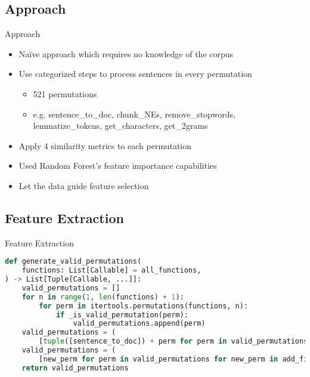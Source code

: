 \documentclass{beamer}
\begin{document}
\subsection{Approach}
\begin{frame}{Approach}
    \begin{itemize}
        \item Naïve approach which requires no knowledge of the corpus
        \item Use categorized steps to process sentences in every permutation
        \begin{itemize}
            \item 521 permutations
            \item e.g. sentence\_to\_doc, chunk\_NEs, remove\_stopwords, lemmatize\_tokens, get\_characters, get\_2grams
        \end{itemize}
        \item Apply 4 similarity metrics to each permutation
        \item Used Random Forest's feature importance capabilities
        \item Let the data guide feature selection
    \end{itemize}

\end{frame}

\subsection{Feature Extraction}
\begin{frame}[fragile]{Feature Extraction}
    \begin{lstlisting}[language=Python]
def generate_valid_permutations(
    functions: List[Callable] = all_functions,
) -> List[Tuple[Callable, ...]]:
    valid_permutations = []
    for n in range(1, len(functions) + 1):
        for perm in itertools.permutations(functions, n):
            if _is_valid_permutation(perm):
                valid_permutations.append(perm)
    valid_permutations = (
        [tuple([sentence_to_doc]) + perm for perm in valid_permutations])
    valid_permutations = (
        [new_perm for perm in valid_permutations for new_perm in add_final_step(perm)])
    return valid_permutations

    \end{lstlisting}
\end{frame}

\end{document}
